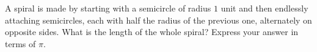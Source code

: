 A spiral is made by starting with a semicircle of radius $1$ unit and then endlessly attaching semicircles, each with half the radius of the previous one, alternately on opposite sides. What is the length of the whole spiral? Express your answer in terms of $\pi$.
